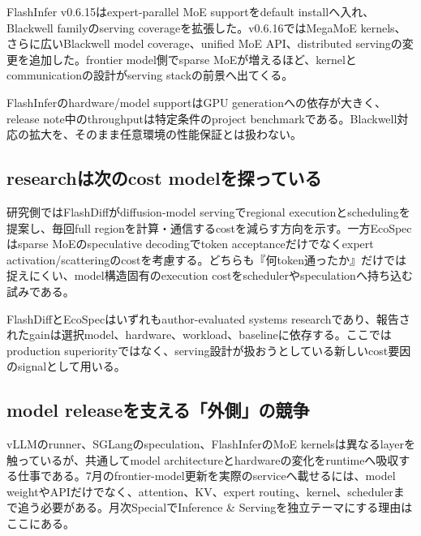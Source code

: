 FlashInfer v0.6.15はexpert-parallel MoE supportをdefault installへ入れ、Blackwell familyのserving coverageを拡張した。v0.6.16ではMegaMoE kernels、さらに広いBlackwell model coverage、unified MoE API、distributed servingの変更を追加した。frontier model側でsparse MoEが増えるほど、kernelとcommunicationの設計がserving stackの前景へ出てくる。\autocite{src-020bbc9ce508,src-b80517d03022}


\begin{claimboundary}
FlashInferのhardware/model supportはGPU generationへの依存が大きく、release note中のthroughputは特定条件のproject benchmarkである。Blackwell対応の拡大を、そのまま任意環境の性能保証とは扱わない。\autocite{src-020bbc9ce508,src-b80517d03022}
\end{claimboundary}

\subsection{researchは次のcost modelを探っている}

研究側ではFlashDiffがdiffusion-model servingでregional executionとschedulingを提案し、毎回full regionを計算・通信するcostを減らす方向を示す。一方EcoSpecはsparse MoEのspeculative decodingでtoken acceptanceだけでなくexpert activation/scatteringのcostを考慮する。どちらも『何token通ったか』だけでは捉えにくい、model構造固有のexecution costをschedulerやspeculationへ持ち込む試みである。\autocite{src-50e29a09d75a,src-d6756f2b6aa6}


\begin{claimboundary}
FlashDiffとEcoSpecはいずれもauthor-evaluated systems researchであり、報告されたgainは選択model、hardware、workload、baselineに依存する。ここではproduction superiorityではなく、serving設計が扱おうとしている新しいcost要因のsignalとして用いる。\autocite{src-50e29a09d75a,src-d6756f2b6aa6}
\end{claimboundary}

\subsection{model releaseを支える「外側」の競争}

vLLMのrunner、SGLangのspeculation、FlashInferのMoE kernelsは異なるlayerを触っているが、共通してmodel architectureとhardwareの変化をruntimeへ吸収する仕事である。7月のfrontier-model更新を実際のserviceへ載せるには、model weightやAPIだけでなく、attention、KV、expert routing、kernel、schedulerまで追う必要がある。月次SpecialでInference \& Servingを独立テーマにする理由はここにある。\autocite{src-020bbc9ce508,src-b811cc97eff4,src-bf2a6d1b9b56,src-d6756f2b6aa6}
